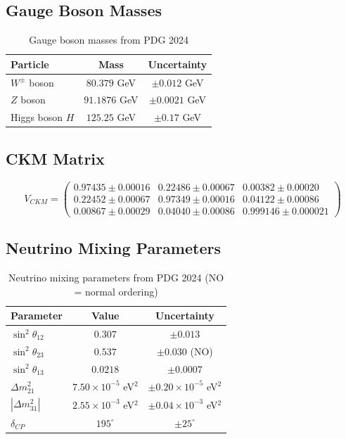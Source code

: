 \subsection{Gauge Boson Masses}

\begin{table}[h]
\centering
\begin{tabular}{lcc}
\hline
Particle & Mass & Uncertainty \\
\hline
$W^\pm$ boson & $80.379$ GeV & $\pm0.012$ GeV \\
$Z$ boson & $91.1876$ GeV & $\pm0.0021$ GeV \\
Higgs boson $H$ & $125.25$ GeV & $\pm0.17$ GeV \\
\hline
\end{tabular}
\caption{Gauge boson masses from PDG 2024}
\end{table}

\subsection{CKM Matrix}

\begin{equation}
V_{CKM} = \begin{pmatrix}
0.97435 \pm 0.00016 & 0.22486 \pm 0.00067 & 0.00382 \pm 0.00020 \\
0.22452 \pm 0.00067 & 0.97349 \pm 0.00016 & 0.04122 \pm 0.00086 \\
0.00867 \pm 0.00029 & 0.04040 \pm 0.00086 & 0.999146 \pm 0.000021
\end{pmatrix}
\end{equation}

\subsection{Neutrino Mixing Parameters}

\begin{table}[h]
\centering
\begin{tabular}{lcc}
\hline
Parameter & Value & Uncertainty \\
\hline
$\sin^2\theta_{12}$ & $0.307$ & $\pm0.013$ \\
$\sin^2\theta_{23}$ & $0.537$ & $\pm0.030$ (NO) \\
$\sin^2\theta_{13}$ & $0.0218$ & $\pm0.0007$ \\
$\Delta m_{21}^2$ & $7.50\times10^{-5}$ eV$^2$ & $\pm0.20\times10^{-5}$ eV$^2$ \\
$|\Delta m_{31}^2|$ & $2.55\times10^{-3}$ eV$^2$ & $\pm0.04\times10^{-3}$ eV$^2$ \\
$\delta_{CP}$ & $195^\circ$ & $\pm 25^\circ$ \\
\hline
\end{tabular}
\caption{Neutrino mixing parameters from PDG 2024 (NO = normal ordering)}
\end{table}

